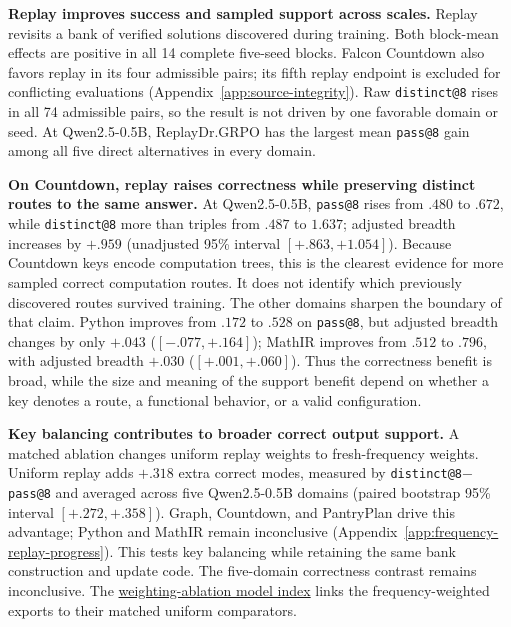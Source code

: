 \documentclass{article}
\newcommand{\1}{\mathbf 1}
\theoremstyle{remark}
\theoremstyle{definition}
\theoremstyle{plain}
\begin{document}
\textbf{Replay improves success and sampled support across scales.}
Replay revisits a bank of verified solutions discovered during training.
Both block-mean effects are positive in all 14 complete five-seed blocks.
Falcon Countdown also favors replay in its four admissible pairs; its fifth
replay endpoint is excluded for conflicting evaluations
(Appendix~\ref{app:source-integrity}). Raw \texttt{distinct@8} rises in all 74
admissible pairs, so the result is not driven by one favorable domain or seed.
At Qwen2.5-0.5B, ReplayDr.GRPO has the largest mean \texttt{pass@8} gain among
all five direct alternatives in every domain.

\textbf{On Countdown, replay raises correctness while preserving distinct
routes to the same answer.} At Qwen2.5-0.5B, \texttt{pass@8} rises from
\(.480\) to \(.672\), while \texttt{distinct@8} more than triples from
\(.487\) to \(1.637\); adjusted breadth increases by \(+.959\)
(unadjusted 95\% interval \([+.863,+1.054]\)). Because Countdown keys encode
computation trees, this is the clearest evidence for more sampled correct computation routes.
It does not identify which previously discovered routes survived training. The other
domains sharpen the boundary of that claim. Python improves from \(.172\) to
\(.528\) on \texttt{pass@8}, but adjusted breadth changes by only \(+.043\)
(\([-.077,+.164]\)); MathIR improves from \(.512\) to \(.796\), with
adjusted breadth \(+.030\) (\([+.001,+.060]\)). Thus the correctness benefit
is broad, while the size and meaning of the support benefit depend on whether a
key denotes a route, a functional behavior, or a valid configuration.

\textbf{Key balancing contributes to broader correct output support.} A matched ablation changes
uniform replay weights to fresh-frequency weights. Uniform replay adds
$+.318$ extra correct modes, measured by \texttt{distinct@8}$-$\texttt{pass@8}
and averaged across five Qwen2.5-0.5B domains (paired bootstrap 95\% interval
$[+.272,+.358]$). Graph, Countdown, and PantryPlan drive this advantage;
Python and MathIR remain inconclusive
(Appendix~\ref{app:frequency-replay-progress}). This tests
key balancing while retaining the same bank construction and update code.
The five-domain correctness contrast remains inconclusive.
The \href{https://huggingface.co/od2961/maxent-grpo-models/blob/main/experiments/E120-R1/README.md\#comparators}{weighting-ablation model index}
links the frequency-weighted exports to their matched uniform comparators.
\end{document}
